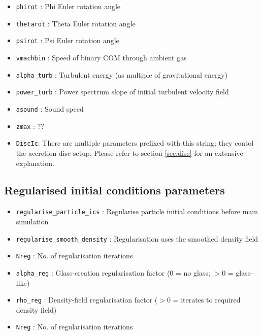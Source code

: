 \documentclass[a4paper]{article}
\newcommand{\var}[1]{\texttt{#1}}
\begin{document}
\begin{itemize}
\item \var{phirot}       : Phi Euler rotation angle
\item \var{thetarot}     : Theta Euler rotation angle
\item \var{psirot}       : Psi Euler rotation angle
\item \var{vmachbin}     : Speed of binary COM through ambient gas

\item \var{alpha\_turb}  : Turbulent energy (as multiple of gravitational energy)
\item \var{power\_turb}  : Power spectrum slope of initial turbulent velocity field

\item \var{asound}       : Sound speed
\item \var{zmax}         : ??

\item \var{DiscIc}: There are multiple parameters prefixed with this string; they contol the accretion disc setup. Please refer to section \ref{sec:disc} for an extensive explanation.

\end{itemize}


\subsection{Regularised initial conditions parameters}

\begin{itemize}

\item \var{regularise\_particle\_ics} : Regularise particle initial conditions before main simulation
\item \var{regularise\_smooth\_density} : Regularisation uses the smoothed density field
\item \var{Nreg}         : No. of regularisation iterations
\item \var{alpha\_reg}   : Glass-creation regularisation factor (0 = no glass; $> 0$ = glass-like)
\item \var{rho\_reg}     : Density-field regularisation factor ($> 0$ = iterates to required density field)
\item \var{Nreg}         : No. of regularisation iterations

\end{itemize}
\end{document}
